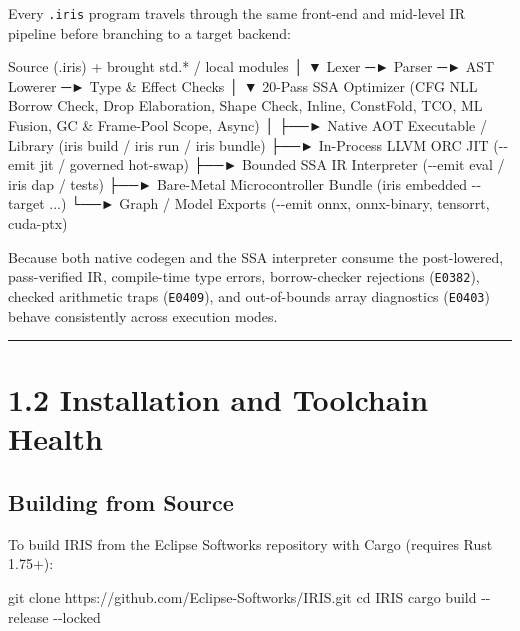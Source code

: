\documentclass[
  english,
  oneside]{book}
\newenvironment{Shaded}{\begin{snugshade}}{\end{snugshade}}
\newcommand{\FunctionTok}[1]{\textcolor[rgb]{0.86,0.86,0.67}{#1}}
\newcommand{\NormalTok}[1]{\textcolor[rgb]{0.83,0.83,0.83}{#1}}
\newcommand{\OperatorTok}[1]{\textcolor[rgb]{0.83,0.83,0.83}{#1}}
\begin{document}
Every \texttt{.iris} program travels through the same front-end and
mid-level IR pipeline before branching to a target backend:

\begin{Shaded}
\begin{Highlighting}[]
\NormalTok{Source (.iris) + brought std.* / local modules}
\NormalTok{       │}
\NormalTok{       ▼  Lexer ─► Parser ─► AST Lowerer ─► Type \& Effect Checks}
\NormalTok{       │}
\NormalTok{       ▼  20{-}Pass SSA Optimizer}
\NormalTok{          (CFG NLL Borrow Check, Drop Elaboration, Shape Check,}
\NormalTok{           Inline, ConstFold, TCO, ML Fusion, GC \& Frame{-}Pool Scope, Async)}
\NormalTok{       │}
\NormalTok{       ├──► Native AOT Executable / Library   (iris build / iris run / iris bundle)}
\NormalTok{       ├──► In{-}Process LLVM ORC JIT           ({-}{-}emit jit / governed hot{-}swap)}
\NormalTok{       ├──► Bounded SSA IR Interpreter        ({-}{-}emit eval / iris dap / tests)}
\NormalTok{       ├──► Bare{-}Metal Microcontroller Bundle (iris embedded {-}{-}target ...)}
\NormalTok{       └──► Graph / Model Exports             ({-}{-}emit onnx, onnx{-}binary, tensorrt, cuda{-}ptx)}
\end{Highlighting}
\end{Shaded}

Because both native codegen and the SSA interpreter consume the
post-lowered, pass-verified IR, compile-time type errors, borrow-checker
rejections (\texttt{E0382}), checked arithmetic traps (\texttt{E0409}),
and out-of-bounds array diagnostics (\texttt{E0403}) behave consistently
across execution modes.

\begin{center}\rule{0.5\linewidth}{0.5pt}\end{center}

\section{1.2 Installation and Toolchain
Health}\label{installation-and-toolchain-health}

\subsection{Building from Source}\label{building-from-source}

To build IRIS from the Eclipse Softworks repository with Cargo (requires
Rust 1.75+):

\begin{Shaded}
\begin{Highlighting}[]
\NormalTok{git clone https}\OperatorTok{://}\NormalTok{github}\OperatorTok{.}\FunctionTok{com}\OperatorTok{/}\NormalTok{Eclipse{-}Softworks}\OperatorTok{/}\NormalTok{IRIS}\OperatorTok{.}\FunctionTok{git}
\FunctionTok{cd}\NormalTok{ IRIS}
\NormalTok{cargo build }\OperatorTok{{-}{-}}\NormalTok{release }\OperatorTok{{-}{-}}\NormalTok{locked}
\end{Highlighting}
\end{Shaded}
\end{document}
